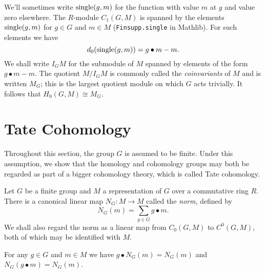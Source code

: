 \begin{example}
	We'll sometimes write $\mathrm{single}(g,m)$ for the function with value $m$ at $g$ and value
	zero elsewhere. The $R$-module $C_1(G,M)$ is spanned by the elements $\mathrm{single}(g,m)$
	for $g \in G$ and $m \in M$ (\texttt{Finsupp.single} in Mathlib).
	For such elements we have
	\[
		d_0(\mathrm{single}(g,m))
		=
		g \bullet m - m.
	\]
	We shall write $I_G M$ for the submodule of $M$ spanned by elements of the form $g \bullet m - m$.
	The quotient $M / I_GM$ is commonly called the \emph{coinvariants} of $M$ and is written $M_G$;
	this is the largest	quotient module on which $G$ acts trivially.
	It follows that $H_0(G,M) \cong M_G$.
\end{example}





\section{Tate Cohomology}

Throughout this section, the group $G$ is assumed to be finite.
Under this assumption, we show that the homology and cohomology groups
may both be regarded as part of a bigger cohomology theory, which is called Tate cohomology.

\begin{definition} \label{def:norm}
	Let $G$ be a finite group and $M$ a representation of $G$ over a commutative ring $R$.
	There is a canonical linear map $N_G : M \to M$ called the \emph{norm},
	defined by
	\[
		N_G(m) = \sum_{g \in G} g \bullet m.
	\]
	We shall also regard the norm as a linear map from $C_0(G,M)$ to $C^0(G,M)$, both of which may
	be identified with $M$.
\end{definition}

\begin{lemma}	\label{lem:norm comm}
	\leanok
	For any $g \in G$ and $m \in M$ we have $g \bullet N_G (m) = N_G (m)$
	and $N_G (g \bullet m) = N_G (m)$.
\end{lemma}

